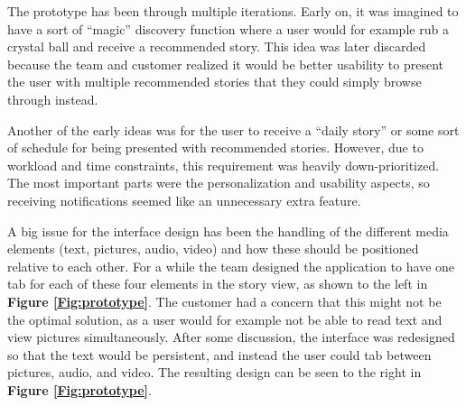 The prototype has been through multiple iterations. Early on, it was imagined to have a sort of “magic” discovery function where a user would for example rub a crystal ball and receive a recommended story. This idea was later discarded because the team and customer realized
 it would be better usability to present the user with multiple recommended stories that they could simply browse through instead.\newline

Another of the early ideas was for the user to receive a “daily story” or some sort of schedule for being presented with recommended stories. However, due to workload and time constraints, this requirement was heavily down-prioritized. The most important parts were the personalization and usability aspects, so receiving notifications seemed like an unnecessary extra feature.\newline

A big issue for the interface design has been the handling of the different media elements (text, pictures, audio, video) and how these should be positioned relative to each other. For a while the team designed the application to have one tab for each of these four elements in the story view, as shown to the left in \textbf{Figure \ref{Fig:prototype}}. The customer had a concern that this might not be the optimal solution, as a user would for example not be able to read text and view pictures simultaneously. After some discussion, the interface was redesigned so that the text would be persistent, and instead the user could tab between pictures, audio, and video. The resulting design can be seen to the right in \textbf{Figure \ref{Fig:prototype}}. 

